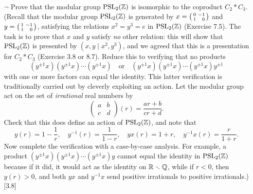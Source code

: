 \begin{problem}
	$\neg$ Prove that the modular group $\mathrm{PSL}_2(\mathbb{Z})$ is isomorphic to the coproduct $C_2 * C_3$. (Recall that the modular group $\mathrm{PSL}_2(\mathbb{Z})$ is generated by
	$x = 
	\begin{psmallmatrix*}[r]
		0 & -1 \\
		1 & 0
	\end{psmallmatrix*}$
	and
	$y =
	\begin{psmallmatrix*}[r]
		1 & -1 \\
		1 & 0
	\end{psmallmatrix*}$,
	satisfying the relations $x^2 = y^3 = e$ in $\mathrm{PSL}_2(\mathbb{Z})$ (Exercise 7.5). The task is to prove that $x$ and $y$ satisfy \emph{no} other relation: this will show that $\mathrm{PSL}_2(\mathbb{Z})$ is presented by $(x, y \mid x^2, y^3)$, and we agreed that this is a presentation for $C_2 * C_3$ (Exercise 3.8 or 8.7). Reduce this to verifying that no products
	\[
		(y^{\pm1}x)(y^{\pm1}x)\cdots(y^{\pm1}x) \quad \text{or} \quad (y^{\pm1}x)(y^{\pm1}x)\cdots(y^{\pm1}x)y^{\pm1}
	\]
	with one or more factors can equal the identity. This latter verification is traditionally carried out by cleverly exploiting an action. Let the modular group act on the set of \emph{irrational} real numbers by
	\[
		\begin{pmatrix}
			a & b \\
			c & d
		\end{pmatrix}
		(r) = \frac{ar+b}{cr+d} \text{.}
	\]
	Check that this does define an action of $\mathrm{PSL}_2(\mathbb{Z})$, and note that
	\[
		y(r) = 1 - \frac{1}{r}, \quad y^{-1}(r) = \frac{1}{1-r}, \quad yx(r) = 1 + r, \quad y^{-1}x(r) = \frac{r}{1+r} \text{.}
	\]
	Now complete the verification with a case-by-case analysis. For example, a product $(y^{\pm1}x)(y^{\pm1}x)\cdots(y^{\pm1}x)y$ cannot equal the identity in $\mathrm{PSL}_2(\mathbb{Z})$ because if it did, it would act as the identity on $\mathbb{R} \smallsetminus \mathbb{Q}$, while if $r < 0$, then $y(r) > 0$, and both $yx$ and $y^{-1}x$ send positive irrationals to positive irrationals.) [3.8]
\end{problem}

